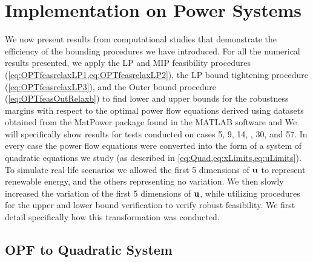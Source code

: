\vspace*{-0.15in}
\section{Implementation on Power Systems} \label{sec:numstd}  
\vspace*{-0.05in}

We now present results from computational studies that demonstrate the efficiency of the bounding procedures we have introduced.
For all the numerical results presented, we apply the LP and MIP feasibility procedures (\cref{eq:OPTfeasrelaxLP1,eq:OPTfeasrelaxLP2}), the LP bound tightening procedure (\cref{eq:OPTfeasrelaxLP3}), and the Outer bound procedure (\cref{eq:OPTfeasOutRelaxb}) to find lower and upper bounds for the robustness margins with respect to the optimal power flow equations derived using datasets obtained from the MatPower package found in the MATLAB software \cite{matpower} and 
We will specifically show results for tests conducted on cases 5, 9, 14, , 30,  and 57. 
In every case the power flow equations were converted into the form of a system of quadratic equations we study (as described in \cref{eq:Quad,eq:xLimits,eq:uLimits}). 
To simulate real life scenarios we allowed the first 5 dimensions of $\mathbf{u}$ to represent renewable energy, and the others representing no variation. We then slowly increased the variation of the first 5 dimensions of $\mathbf{u}$, while utilizing procedures for the upper and lower bound verification to verify robust feasibility. 
We first detail specifically how this transformation was conducted.

\vspace*{-0.10in}
\subsection{OPF to Quadratic System} \label{ssec:opf2qsys}

